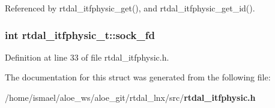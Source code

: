 Referenced by rtdal\-\_\-itfphysic\-\_\-get(), and rtdal\-\_\-itfphysic\-\_\-get\-\_\-id().

\subsubsection[{sock\-\_\-fd}]{\setlength{\rightskip}{0pt plus 5cm}int rtdal\-\_\-itfphysic\-\_\-t\-::sock\-\_\-fd}\label{structrtdal__itfphysic__t_a317608cf9f44fca72c5488b37472c0e7}


Definition at line 33 of file rtdal\-\_\-itfphysic.\-h.



The documentation for this struct was generated from the following file\-:\begin{DoxyCompactItemize}
\item 
/home/ismael/aloe\-\_\-ws/aloe\-\_\-git/rtdal\-\_\-lnx/src/{\bf rtdal\-\_\-itfphysic.\-h}\end{DoxyCompactItemize}
